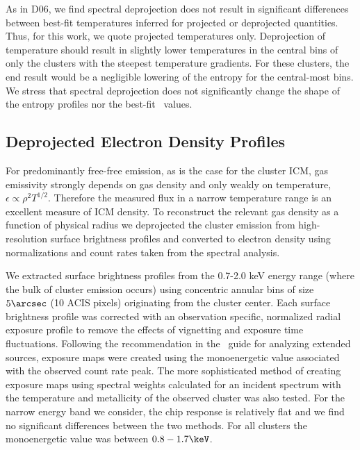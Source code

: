 \documentclass{emulateapj}
\begin{document}
As in D06, we find spectral deprojection does not result in
significant differences between best-fit temperatures inferred for
projected or deprojected quantities. Thus, for this work, we quote
projected temperatures only. Deprojection of temperature should result
in slightly lower temperatures in the central bins of only the
clusters with the steepest temperature gradients. For these clusters,
the end result would be a negligible lowering of the entropy for the
central-most bins. We stress that spectral deprojection does not
significantly change the shape of the entropy profiles nor the
best-fit \kna\ values.

\subsection{Deprojected Electron Density Profiles}
\label{sec:dene}

For predominantly free-free emission, as is the case for the cluster
ICM, gas emissivity strongly depends on gas density and only weakly on
temperature, $\epsilon \propto \rho^2 T^{1/2}$. Therefore the measured
flux in a narrow temperature range is an excellent measure of ICM
density. To reconstruct the relevant gas density as a function of
physical radius we deprojected the cluster emission from
high-resolution surface brightness profiles and converted to electron
density using normalizations and count rates taken from the spectral
analysis.

We extracted surface brightness profiles from the 0.7-2.0 keV energy
range (where the bulk of cluster emission occurs) using concentric
annular bins of size $5\arcsec$ (10 ACIS pixels) originating from the
cluster center. Each surface brightness profile was corrected with an
observation specific, normalized radial exposure profile to remove the
effects of vignetting and exposure time fluctuations. Following the
recommendation in the \ciao\ guide for analyzing extended sources,
exposure maps were created using the monoenergetic value associated
with the observed count rate peak. The more sophisticated method of
creating exposure maps using spectral weights calculated for an
incident spectrum with the temperature and metallicity of the observed
cluster was also tested. For the narrow energy band we consider, the
chip response is relatively flat and we find no significant
differences between the two methods. For all clusters the
monoenergetic value was between $0.8-1.7\keV$.
\end{document}
